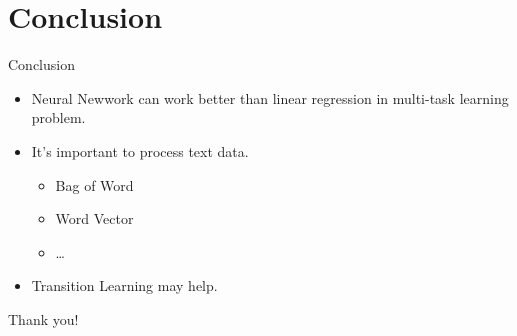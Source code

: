 \documentclass[
 size=12pt,
 paper=smartboard, %
 mode=present, %
 display=slides, %
style=tuliplab,
pauseslide,
fleqn,leqno]{powerdot}
\begin{document}
\section{Conclusion}
\begin{slide}{Conclusion}
    \begin{itemize}
        \item Neural Newwork can work better than linear regression in multi-task learning problem.
        \item It's important to process text data.
        \begin{itemize}
            \item Bag of Word
            \item Word Vector
            \item \dots
        \end{itemize}
        \item Transition Learning may help.
    \end{itemize}
\end{slide}
\begin{emptyslide}{}
	\centering
	{\huge Thank you!}
\end{emptyslide}
\end{document}
